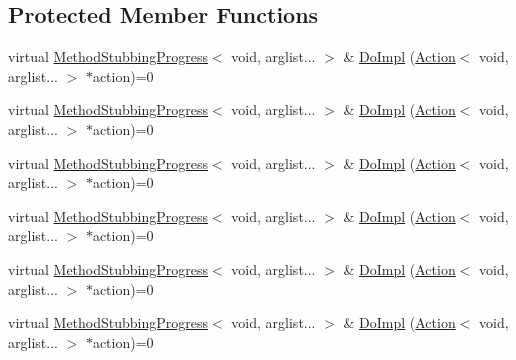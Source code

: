 \subsection*{Protected Member Functions}
\begin{DoxyCompactItemize}
\item 
virtual \mbox{\hyperlink{structfakeit_1_1MethodStubbingProgress}{Method\+Stubbing\+Progress}}$<$ void, arglist... $>$ \& \mbox{\hyperlink{structfakeit_1_1MethodStubbingProgress_3_01void_00_01arglist_8_8_8_01_4_a14b0b058c37c9539550e6d17395e1e60}{Do\+Impl}} (\mbox{\hyperlink{structfakeit_1_1Action}{Action}}$<$ void, arglist... $>$ $\ast$action)=0
\item 
virtual \mbox{\hyperlink{structfakeit_1_1MethodStubbingProgress}{Method\+Stubbing\+Progress}}$<$ void, arglist... $>$ \& \mbox{\hyperlink{structfakeit_1_1MethodStubbingProgress_3_01void_00_01arglist_8_8_8_01_4_a14b0b058c37c9539550e6d17395e1e60}{Do\+Impl}} (\mbox{\hyperlink{structfakeit_1_1Action}{Action}}$<$ void, arglist... $>$ $\ast$action)=0
\item 
virtual \mbox{\hyperlink{structfakeit_1_1MethodStubbingProgress}{Method\+Stubbing\+Progress}}$<$ void, arglist... $>$ \& \mbox{\hyperlink{structfakeit_1_1MethodStubbingProgress_3_01void_00_01arglist_8_8_8_01_4_a14b0b058c37c9539550e6d17395e1e60}{Do\+Impl}} (\mbox{\hyperlink{structfakeit_1_1Action}{Action}}$<$ void, arglist... $>$ $\ast$action)=0
\item 
virtual \mbox{\hyperlink{structfakeit_1_1MethodStubbingProgress}{Method\+Stubbing\+Progress}}$<$ void, arglist... $>$ \& \mbox{\hyperlink{structfakeit_1_1MethodStubbingProgress_3_01void_00_01arglist_8_8_8_01_4_a14b0b058c37c9539550e6d17395e1e60}{Do\+Impl}} (\mbox{\hyperlink{structfakeit_1_1Action}{Action}}$<$ void, arglist... $>$ $\ast$action)=0
\item 
virtual \mbox{\hyperlink{structfakeit_1_1MethodStubbingProgress}{Method\+Stubbing\+Progress}}$<$ void, arglist... $>$ \& \mbox{\hyperlink{structfakeit_1_1MethodStubbingProgress_3_01void_00_01arglist_8_8_8_01_4_a14b0b058c37c9539550e6d17395e1e60}{Do\+Impl}} (\mbox{\hyperlink{structfakeit_1_1Action}{Action}}$<$ void, arglist... $>$ $\ast$action)=0
\item 
virtual \mbox{\hyperlink{structfakeit_1_1MethodStubbingProgress}{Method\+Stubbing\+Progress}}$<$ void, arglist... $>$ \& \mbox{\hyperlink{structfakeit_1_1MethodStubbingProgress_3_01void_00_01arglist_8_8_8_01_4_a14b0b058c37c9539550e6d17395e1e60}{Do\+Impl}} (\mbox{\hyperlink{structfakeit_1_1Action}{Action}}$<$ void, arglist... $>$ $\ast$action)=0

\end{DoxyCompactItemize}
